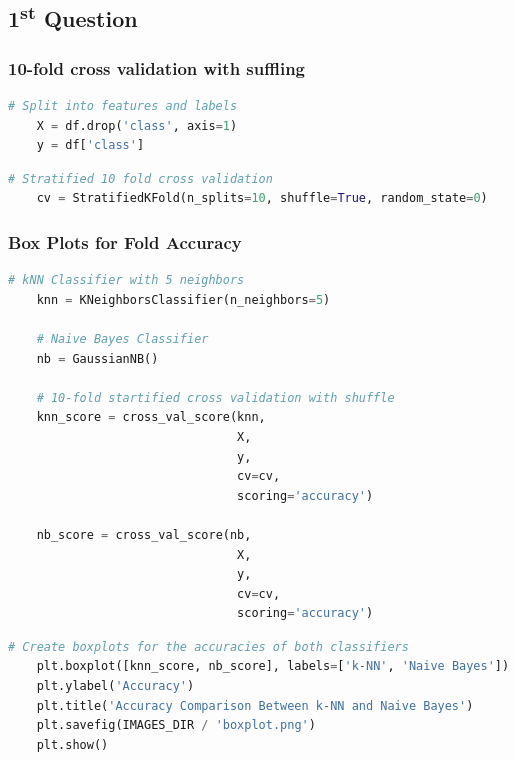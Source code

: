 \documentclass{article}
\begin{document}
\subsection*{1\textsuperscript{st} Question}

\subsubsection*{10-fold cross validation with suffling }

  \begin{lstlisting}[language=Python]
    # Split into features and labels 
    X = df.drop('class', axis=1)
    y = df['class']
  \end{lstlisting}

  \begin{lstlisting}[language=Python]
    # Stratified 10 fold cross validation
    cv = StratifiedKFold(n_splits=10, shuffle=True, random_state=0)
  \end{lstlisting}

\subsubsection*{Box Plots for Fold Accuracy}
  \begin{lstlisting}[language=Python]
    # kNN Classifier with 5 neighbors
    knn = KNeighborsClassifier(n_neighbors=5)

    # Naive Bayes Classifier
    nb = GaussianNB()

    # 10-fold startified cross validation with shuffle
    knn_score = cross_val_score(knn,
                                X,
                                y,
                                cv=cv,
                                scoring='accuracy')

    nb_score = cross_val_score(nb,
                                X,
                                y,
                                cv=cv,
                                scoring='accuracy')
  \end{lstlisting}

  \begin{lstlisting}[language=Python]
    # Create boxplots for the accuracies of both classifiers
    plt.boxplot([knn_score, nb_score], labels=['k-NN', 'Naive Bayes'])
    plt.ylabel('Accuracy')
    plt.title('Accuracy Comparison Between k-NN and Naive Bayes')
    plt.savefig(IMAGES_DIR / 'boxplot.png')
    plt.show()
  \end{lstlisting}
\end{document}
